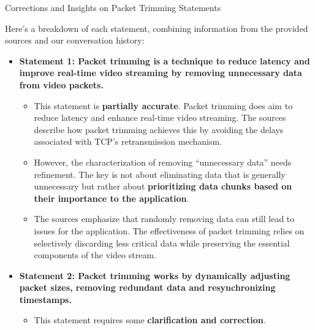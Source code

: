 \documentclass[
]{article}
\author{}
\date{}
\begin{document}
{Corrections and Insights on Packet Trimming
Statements}\label{corrections-and-insights-on-packet-trimming-statements}

Here's a breakdown of each statement, combining information from the
provided sources and our conversation history:

\begin{itemize}
\item
  \textbf{Statement 1: Packet trimming is a technique to reduce latency
  and improve real-time video streaming by removing unnecessary data
  from video packets.}

  \begin{itemize}
  
  \item
    This statement is \textbf{partially accurate}. Packet trimming does
    aim to reduce latency and enhance real-time video streaming. The
    sources describe how packet trimming achieves this by avoiding the
    delays associated with TCP's retransmission mechanism.
  \item
    However, the characterization of removing ``unnecessary data'' needs
    refinement. The key is not about eliminating data that is generally
    unnecessary but rather about \textbf{prioritizing data chunks based
    on their importance to the application}.
  \item
    The sources emphasize that randomly removing data can still lead to
    issues for the application. The effectiveness of packet trimming
    relies on selectively discarding less critical data while preserving
    the essential components of the video stream.
  \end{itemize}
\item
  \textbf{Statement 2: Packet trimming works by dynamically adjusting
  packet sizes, removing redundant data and resynchronizing timestamps.}

  \begin{itemize}
  
  \item
    This statement requires some \textbf{clarification and correction}.

    \begin{itemize}
    

\end{itemize}
\end{itemize}
\end{itemize}
\end{document}
